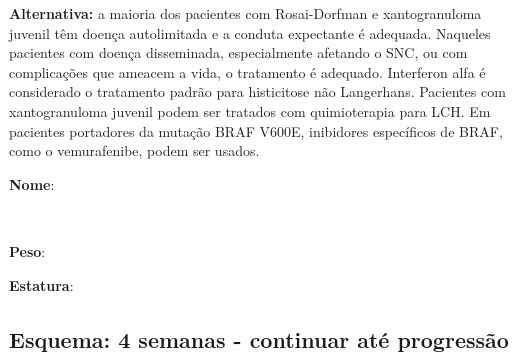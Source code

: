 \documentclass[11pt,a4paper,oldfontcommands]{memoir}
\def\entrywithlabel[#1]#2{\parbox{#1}{{\small #2:} \hrulefill}}
\begin{document}
\textbf{Alternativa:} a maioria dos pacientes com Rosai-Dorfman e xantogranuloma juvenil têm doença autolimitada e a conduta expectante é adequada. Naqueles pacientes com doença disseminada, especialmente afetando o SNC, ou com complicações que ameacem a vida, o tratamento é adequado. Interferon alfa é considerado o tratamento padrão para histicitose não Langerhans. Pacientes com xantogranuloma juvenil podem ser tratados com quimioterapia para LCH. Em pacientes portadores da mutação BRAF V600E, inibidores específicos de BRAF, como o vemurafenibe, podem ser usados.
\\[0.4cm]
\entrywithlabel[1\hsize]{\textbf{Nome}}\hfill
\\[0.3cm]
\entrywithlabel[.45\hsize]{\textbf{Peso}}\hfill  \entrywithlabel[.45\hsize]{\textbf{Estatura}}

\subsection{Esquema: 4 semanas - continuar até progressão}
\end{document}
